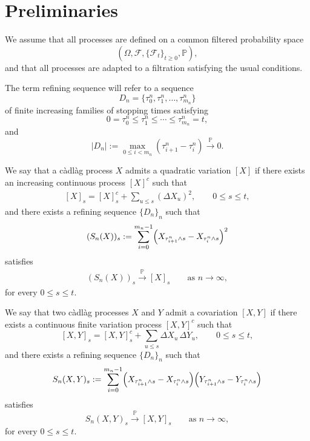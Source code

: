 \documentclass[a4paper,10pt]{article}
\newtheorem{defin}[thm]{Definition}
\begin{document}




\section{Preliminaries}

We assume that all processes are defined on a common filtered probability
space
\[
(\Omega,\mathcal F,\{\mathcal F_t\}_{t\ge0},\mathbb P),
\]
and that all processes are adapted to a filtration satisfying the usual
conditions.

The term refining sequence will refer to a sequence
\[
D_n=\{\tau_0^n,\tau_1^n,\ldots,\tau_{m_n}^n\}
\]
of finite increasing families of stopping times satisfying
\[
0=\tau_0^n\le\tau_1^n\le\cdots\le\tau_{m_n}^n=t,
\]
and
\[
|D_n|
:=
\max_{0\le i<m_n}
(\tau_{i+1}^n-\tau_i^n)
\xrightarrow{\mathbb P}0.
\]

We say that a c\`adl\`ag process \(X\) admits a quadratic variation
\([X]\) if there exists an increasing continuous process \([X]^c\) such
that
\begin{align}\label{quad}
[X]_s
=
[X]^c_s
+
\sum_{u\le s}(\Delta X_u)^2,
\qquad 0\le s\le t,
\end{align}
and there exists a refining sequence \(\{D_n\}_n\) such that
\[
(S_n(X))_s
:=
\sum_{i=0}^{m_n-1}
\Bigl(
X_{\tau_{i+1}^n\wedge s}
-
X_{\tau_i^n\wedge s}
\Bigr)^2
\]
satisfies
\begin{align}\label{partialsums}
(S_n(X))_s
\xrightarrow{\mathbb P}
[X]_s
\qquad\text{as }n\to\infty,
\end{align}
for every \(0\le s\le t\).

We say that two c\`adl\`ag processes \(X\) and \(Y\) admit a
covariation \([X,Y]\) if there exists a continuous finite variation
process \([X,Y]^c\) such that
\[
[X,Y]_s
=
[X,Y]^c_s
+
\sum_{u\le s}\Delta X_u\,\Delta Y_u,
\qquad 0\le s\le t,
\]
and there exists a refining sequence \(\{D_n\}_n\) such that
\[
S_n(X,Y)_s
:=
\sum_{i=0}^{m_n-1}
\Bigl(
X_{\tau_{i+1}^n\wedge s}
-
X_{\tau_i^n\wedge s}
\Bigr)
\Bigl(
Y_{\tau_{i+1}^n\wedge s}
-
Y_{\tau_i^n\wedge s}
\Bigr)
\]
satisfies
\[
S_n(X,Y)_s
\xrightarrow{\mathbb P}
[X,Y]_s
\qquad\text{as }n\to\infty,
\]
for every \(0\le s\le t\).
\end{document}
